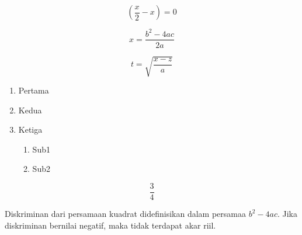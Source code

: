 \documentclass{article}
\begin{document}
$$\left(\frac{x}{2}-x\right)=0$$

$$x=\frac{b^2-4ac}{2a}$$

$$t=\sqrt{\frac{x-z}{a}}$$

\begin{enumerate}

\item Pertama

\item Kedua

\item Ketiga
	\begin{enumerate}
	\item Sub1
	\item Sub2
	\end{enumerate}

\end{enumerate}

$$\frac{3}{4}$$

Diskriminan dari persamaan kuadrat didefinisikan dalam persamaa $b^2 -4ac$. Jika diskriminan bernilai negatif, maka tidak terdapat akar riil.
\end{document}

